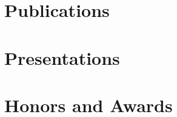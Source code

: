 \documentclass[letterpaper,12pt]{article}
\begin{document}
\section{Publications}
\begin{refsection}
\nocite{*}
\printbibliography[heading=none]
\end{refsection}


\section{Presentations}
\begin{refsection}
\nocite{*}
\printbibliography[heading=none]
\end{refsection}






\section{Honors and Awards}
\end{document}
